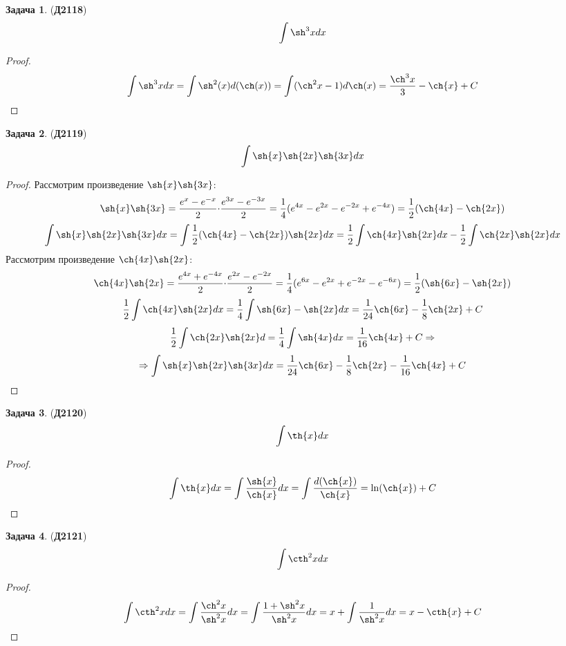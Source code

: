 \documentclass[12pt]{article}
\theoremstyle{definition}
\newtheorem{problem}{Задача}
\DeclareMathOperator{\dint}{\displaystyle\int}
\begin{document}
\begin{problem}(\textbf{Д2118})
	$$
		\dint \sh^3{x} dx
	$$
\end{problem}
\begin{proof}
	$$
		\dint \sh^3{x} dx = \dint \sh^2(x)d(\ch(x)) = \dint (\ch^2x - 1)d\ch(x) = \dfrac{\ch^3x}{3} - \ch{x} + C
	$$
\end{proof}


\begin{problem}(\textbf{Д2119})
	$$
		\dint \sh{x}\sh{2x}\sh{3x}dx
	$$
\end{problem}
\begin{proof}
	Рассмотрим произведение $\sh{x}\sh{3x}$:
	$$
		\sh{x}\sh{3x} = \dfrac{e^{x} - e^{-x}}{2}{\cdot}\dfrac{e^{3x} - e^{-3x}}{2} = \dfrac{1}{4}(e^{4x} -e^{2x} - e^{-2x} + e^{-4x}) = \dfrac{1}{2}(\ch{4x} - \ch{2x})
	$$
	$$
		\dint \sh{x}\sh{2x}\sh{3x}dx = \dint \dfrac{1}{2}(\ch{4x} - \ch{2x})\sh{2x}dx = \dfrac{1}{2}\dint\ch{4x}\sh{2x}dx - \dfrac{1}{2}\dint\ch{2x}\sh{2x}dx
	$$
	Рассмотрим произведение $\ch{4x}\sh{2x}$:
	$$
		\ch{4x}\sh{2x} = \dfrac{e^{4x} + e^{-4x}}{2}{\cdot}\dfrac{e^{2x} - e^{-2x}}{2} = \dfrac{1}{4}(e^{6x} - e^{2x} + e^{-2x} - e^{-6x}) = \dfrac{1}{2}(\sh{6x} - \sh{2x})
	$$
	$$
		\dfrac{1}{2}\dint\ch{4x}\sh{2x}dx = \dfrac{1}{4}\dint \sh{6x} - \sh{2x}dx = \dfrac{1}{24}\ch{6x} - \dfrac{1}{8}\ch{2x}  + C
	$$
	$$
		\dfrac{1}{2}\dint\ch{2x}\sh{2x}d = \dfrac{1}{4}\dint \sh{4x}dx = \dfrac{1}{16}\ch{4x} + C \Rightarrow
	$$
	$$
		\Rightarrow \dint \sh{x}\sh{2x}\sh{3x}dx = \dfrac{1}{24}\ch{6x} - \dfrac{1}{8}\ch{2x} - \dfrac{1}{16}\ch{4x} + C
	$$
\end{proof}

\begin{problem}(\textbf{Д2120})
	$$
		\dint \th{x}dx
	$$
\end{problem}
\begin{proof}
	$$
		\dint \th{x}dx = \dint \dfrac{\sh{x}}{\ch{x}}dx = \dint \dfrac{d(\ch{x})}{\ch{x}} = \ln(\ch{x}) + C
	$$
\end{proof}

\begin{problem}(\textbf{Д2121})
	$$
		\dint \cth^2{x}dx
	$$
\end{problem}
\begin{proof}
	$$
		\dint \cth^2{x}dx = \dint \dfrac{\ch^2{x}}{\sh^2{x}}dx= \dint \dfrac{1 + \sh^2{x}}{\sh^2{x}}dx = x + \dint\dfrac{1}{\sh^2{x}}dx = x - \cth{x} + C
	$$
\end{proof}
\end{document}
